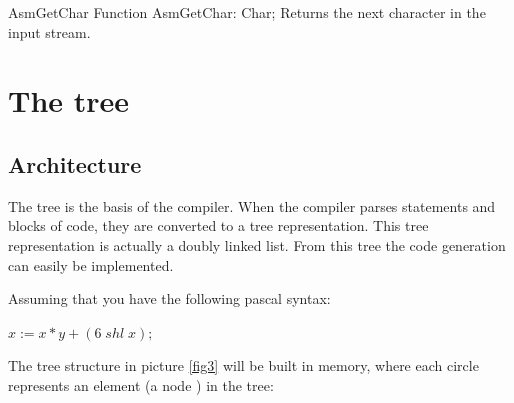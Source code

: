 \documentclass [a4paper,12pt]{article}
\begin{document}
\begin{function}{AsmGetChar}
\Declaration
Function AsmGetChar: Char;
\Description
Returns the next character in the input stream. 
\end{function}


\section{The tree}
\label{sec:mylabel2}

\subsection{Architecture}
\label{subsec:architecturenext}

The tree is the basis of the compiler. When the compiler parses statements
and blocks of code, they are converted to a tree representation. This tree
representation is actually a doubly linked list. From this tree the code
generation can easily be implemented.

Assuming that you have the following pascal syntax:


\begin{center}
$ x := x * y + (6\; shl \; x);$
\end{center}

The tree structure in picture \ref{fig3} will be built in memory, where each
circle represents an element (a node ) in the tree:
\end{document}
